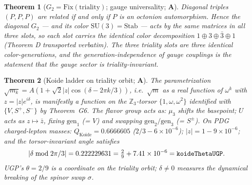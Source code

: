 \documentclass[11pt]{article}
\newtheorem{theorem}{Theorem}[section]
\theoremstyle{remark}
\newcommand{\lean}[1]{%
  \penalty-100
  \begingroup\def\_{\textunderscore\allowbreak}\texttt{#1}\endgroup}
\newcommand{\CatA}{\textbf{A}}
\begin{document}
\begin{theorem}[$G_2 = \mathrm{Fix}(\text{triality})$; gauge universality; \CatA]
\label{thm:H1}
Diagonal triples $(P,P,P)$ are related if and only if $P$ is an octonion
automorphism.
Hence the diagonal $G_2$ --- and its color $\mathrm{SU}(3) = \mathrm{Stab}$ ---
acts by the same matrices in all three slots, so each slot carries the
identical color decomposition $1\oplus 3\oplus\bar{3}\oplus 1$
(Theorem D transported verbatim).
\emph{The three triality slots are three identical color-generations, and the
generation-independence of gauge couplings is the statement that the gauge
sector is triality-invariant.}
\end{theorem}

\begin{theorem}[Koide ladder on triality orbit; \CatA]
\label{thm:H2}
The parametrization
$\sqrt{m_k} = A(1 + \sqrt{2}|z|\cos(\delta - 2\pi k/3))$,
i.e.\ $\sqrt{m}$ as a real function of $\omega^k$ with $z = |z|e^{i\delta}$,
is manifestly a function on the $\mathbb{Z}_3$-torsor $\{1,\omega,\omega^2\}$
identified with $\{V, S^+, S^-\}$ by Theorem~G6.
The flavor group acts as: $\mu_3$ shifts the basepoint; $U$ acts as
$z\mapsto\bar{z}$, fixing $\mathrm{gen}_1$ (= $V$) and swapping $\mathrm{gen}_2/\mathrm{gen}_3$
(= $S^\pm$).
On PDG charged-lepton masses:
$Q_{\mathrm{Koide}} = 0.6666605$ ($2/3 - 6\times10^{-6}$);
$|z| = 1 - 9\times 10^{-6}$; and the torsor-invariant angle satisfies
\[
  |\delta\bmod 2\pi/3| = 0.222229631 = \tfrac{2}{9} + 7.41\times10^{-6}
  = \text{\lean{koideThetaUGP}}.
\]
UGP's $\theta = 2/9$ is a coordinate on the triality orbit; $\delta\neq 0$
measures the dynamical breaking of the spinor swap $\sigma$.
\end{theorem}
\end{document}
